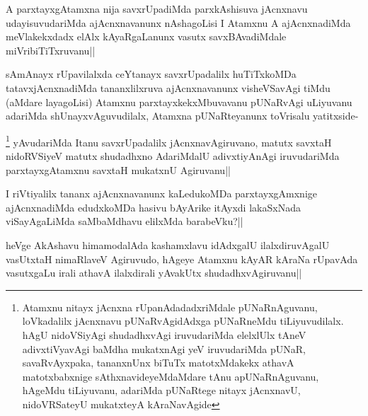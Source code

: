 \begin{artha}
A parxtayxgAtamxna nija savxrUpadiMda parxkAshisuva jAcnxnavu udayisuvudariMda ajAcnxnavanunx nAshagoLisi I Atamxnu A ajAcnxnadiMda meVlakekxdadx elAlx kAyaRgaLanunx vasutx savxBAvadiMdale miVribiTiTxruvanu||
\end{artha}


\begin{artha}
sAmAnayx rUpavilalxda ceYtanayx savxrUpadalilx huTiTxkoMDa tatavxjAcnxnadiMda tananxlilxruva ajAcnxnavanunx visheVSavAgi tiMdu (aMdare layagoLisi) Atamxnu parxtayxkekxMbuvavanu pUNaRvAgi uLiyuvanu adariMda shUnayxvAguvudilalx, Atamxna pUNaRteyanunx toVrisalu yatitxside-
\end{artha}


\begin{artha}
\footnote[1]{Atamxnu nitayx jAcnxna rUpanAdadadxriMdale pUNaRnAguvanu, loVkadalilx jAcnxnavu pUNaRvAgidAdxga pUNaRneMdu tiLiyuvudilalx. hAgU nidoVSiyAgi shudadhxvAgi iruvudariMda elelxlUlx tAneV adivxtiVyavAgi baMdha mukatxnAgi yeV iruvudariMda pUNaR, savaRvAyxpaka, tananxnUnx biTuTx matotxMdakekx athavA matotxbabxnige sAthxnavideyeMdaMdare tAnu apUNaRnAguvanu, hAgeMdu tiLiyuvanu, adariMda pUNaRtege nitayx jAcnxnavU, nidoVRSateyU mukatxteyA kAraNavAgide} yAvudariMda Itanu savxrUpadalilx jAcnxnavAgiruvano, matutx savxtaH nidoRVSiyeV matutx shudadhxno AdariMdalU adivxtiyAnAgi iruvudariMda parxtayxgAtamxnu savxtaH mukatxnU Agiruvanu|| 
\end{artha}%

\begin{artha}
I riVtiyalilx tananx ajAcnxnavanunx kaLedukoMDa parxtayxgAmxnige ajAcnxnadiMda edudxkoMDa hasivu bAyArike itAyxdi lakaSxNada viSayAgaLiMda saMbaMdhavu elilxMda barabeVku?||
\end{artha}


\begin{artha}
heVge AkAshavu himamodalAda kashamxlavu idAdxgalU ilalxdiruvAgalU vasUtxtaH nimaRlaveV Agiruvudo, hAgeye Atamxnu kAyAR kAraNa rUpavAda vasutxgaLu irali athavA ilalxdirali yAvakUtx shudadhxvAgiruvanu||
\end{artha}


